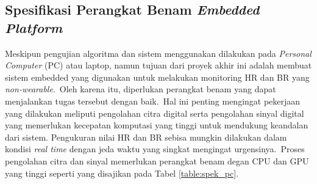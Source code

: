 \subsection{Spesifikasi Perangkat Benam \textit{Embedded Platform}}
Meskipun pengujian algoritma dan sistem menggunakan dilakukan pada \textit{Personal Computer} (PC) atau laptop, namun tujuan dari proyek akhir ini adalah membuat sistem embedded yang digunakan untuk melakukan monitoring HR dan BR yang \textit{non-wearable}.~Oleh karena itu, diperlukan perangkat benam yang dapat menjalankan tugas tersebut dengan baik.~Hal ini penting mengingat pekerjaan yang dilakukan meliputi pengolahan citra digital serta pengolahan sinyal digital yang memerlukan kecepatan komputasi yang tinggi untuk mendukung keandalan dari sistem. Pengukuran nilai HR dan BR sebisa mungkin dilakukan dalam kondisi \textit{real time} dengan jeda waktu yang singkat mengingat urgensinya.~Proses pengolahan citra dan sinyal memerlukan perangkat benam degan CPU dan GPU yang tinggi seperti yang disajikan pada Tabel \ref{table:spek_pc}.

\begin{table}[ht]
	\vspace{0.6em}
	\caption{Spesifikasi Perangkat Benam untuk Proses Monitoring HR dan BR}
	\centering
	\label{table:spek_pc}
\end{table}

